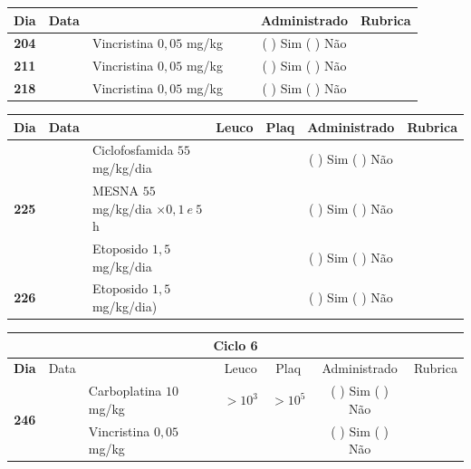 \documentclass[11pt,a4paper,oldfontcommands]{memoir}
\begin{document}
\begin{center}
\begin{table}[H]
\begin{tabular}{p{1cm}c|p{4.8cm}|p{1.8cm}p{1.8cm}|c|c}
	\hline
	\multicolumn{1}{c|}{\multirow{1}{*}{\textbf{Dia}}}&{Data}&{}&{}&&{Administrado}&{Rubrica} \\
    \hline
    \multicolumn{1}{c|}{\textbf{204}}&&{Vincristina \(0,05\) mg/kg}&\multicolumn{1}{c}{}&&{(  ) Sim (  ) Não}&\\
    \hline
    \multicolumn{1}{c|}{\textbf{211}}&&{Vincristina \(0,05\) mg/kg}&\multicolumn{1}{c}{}&&{(  ) Sim (  ) Não}&\\
    \hline
    \multicolumn{1}{c|}{\textbf{218}}&&{Vincristina \(0,05\) mg/kg}&\multicolumn{1}{c}{}&&{(  ) Sim (  ) Não}&\\
    \hline
\end{tabular}
\end{table}
\begin{table}[H] \small
\begin{tabular}{p{1cm}c|p{4.8cm}|p{1.8cm}p{1.8cm}|c|c}
	\hline
	\multicolumn{1}{c|}{\multirow{1}{*}{\textbf{Dia}}}&{Data}&{}&\multicolumn{1}{c|}{Leuco}&\multicolumn{1}{c|}{Plaq}&{Administrado}&{Rubrica} \\
    \hline
    \multicolumn{1}{c|}{\multirow{3}{*}{\textbf{225}}}&&{Ciclofosfamida \(55\) mg/kg/dia}&\multicolumn{1}{c|}{}&&{(  ) Sim (  ) Não}&\\
    \cline{4-5}
    \multicolumn{1}{c|}{}&&{MESNA \(55\) mg/kg/dia \(\times 0,1 \:e\: 5\)h}&&&{(  ) Sim (  ) Não}&\\
    \multicolumn{1}{c|}{}&&{Etoposido \(1,5\) mg/kg/dia}&&&{(  ) Sim (  ) Não}&\\
    \hline
    \multicolumn{1}{c|}{\multirow{1}{*}{\textbf{226}}}&&{Etoposido \(1,5\) mg/kg/dia)}&{}&&{(  ) Sim (  ) Não}&\\
    \hline
\end{tabular}
\end{table}
\begin{table}[H] \small
\begin{tabular}{p{1cm}c|p{4.8cm}|p{1.8cm}p{1.8cm}|c|c}
	\hline
	\multicolumn{7}{c}{Ciclo 6} \\
	\hline
	\multicolumn{1}{c|}{\multirow{1}{*}{\textbf{Dia}}}&{Data}&{}&\multicolumn{1}{c|}{Leuco}&\multicolumn{1}{c|}{Plaq}&{Administrado}&{Rubrica} \\
    \hline
    \multicolumn{1}{c|}{\multirow{3}{*}{\textbf{246}}}&\multirow{2}{*}{}&{Carboplatina \(10\) mg/kg}&\multicolumn{1}{c|}{\(>10^3\)}&\multicolumn{1}{c|}{\(>10^5\)}&{(  ) Sim (  ) Não}&\\
    \cline{4-5}
    \multicolumn{1}{c|}{}&&{Vincristina \(0,05\) mg/kg}&\multicolumn{1}{c|}{}&&{(  ) Sim (  ) Não}&\\

\end{tabular}
\end{table}
\end{center}
\end{document}
